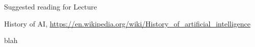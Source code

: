 \begin{frame}{Suggested reading for Lecture \thislecture}

\begin{itemize}
{\scriptsize
\item History of AI, \url{https://en.wikipedia.org/wiki/History_of_artificial_intelligence}
\item blah
}
\end{itemize}

\end{frame}

